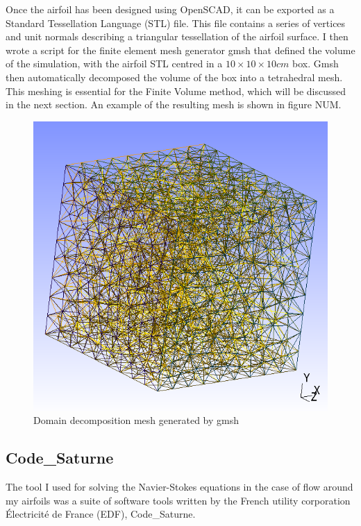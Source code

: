 \documentclass[12pt]{article}
\begin{document}
Once the airfoil has been designed using OpenSCAD, it can be exported as a 
Standard Tessellation Language (STL) file.  This file contains a series of
vertices and unit normals describing a triangular tessellation of the airfoil
surface.  I then wrote a script for the finite element mesh generator gmsh that
defined the volume of the simulation, with the airfoil STL centred in a 
$10\times 10\times 10 cm$ box.  Gmsh then automatically decomposed the volume
of the box into a tetrahedral mesh.  This meshing is essential for the Finite
Volume method, which will be discussed in the next section.
An example of the resulting mesh is shown in figure NUM.


\begin{figure}[H]
\centering
\includegraphics[width=6in]{../images/mesh.png}
\caption{Domain decomposition mesh generated by gmsh}
\end{figure}

\subsection{Code\_Saturne}
The tool I used for solving the Navier-Stokes equations in the case
of flow around my airfoils was a 
suite of software tools written by the French utility corporation 
\'{E}lectricit\'{e} de France (EDF), Code\_Saturne.  
\end{document}
